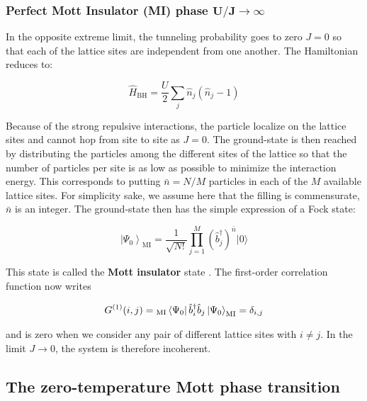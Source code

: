 \subsubsection{Perfect Mott Insulator (MI) phase $\bm{U/J \to \infty}$}

In the opposite extreme limit, the tunneling probability goes to zero $J=0$ so that each of the lattice sites are independent from one another. The Hamiltonian reduces to:

\begin{equation}
    \hat{H}_{\mathrm{BH}} = \frac{U}{2} \sum_j \hat{n}_j (\hat{n}_j -1)
\end{equation}

Because of the strong repulsive interactions, the particle localize on the lattice sites and cannot hop from site to site as $J=0$. The ground-state is then reached by distributing the particles among the different sites of the lattice so that the number of particles per site is as low as possible to minimize the interaction energy. This corresponds to putting $\bar{n}=N/M$ particles in each of the $M$ available lattice sites. For simplicity sake, we assume here that the filling is commensurate, \ie $\bar{n}$ is an integer. The ground-state then has the simple expression of a Fock state:

\begin{equation}
    \left|\Psi_{0}\right\rangle_{\mathrm{MI}}=\frac{1}{\sqrt{N !}} \prod_{j=1}^{M}\left(\hat{b}_{j}^{\dagger}\right)^{\bar{n}}|0\rangle
    \label{eq:ground-state_MI}
\end{equation}

\noindent This state is called the \textbf{Mott insulator} state \cite{fisher1989boson}. The first-order correlation function now writes

\begin{equation}
     G^{(1)}(i,j)= {}_{\mathrm{MI}} \bra{\Psi_0} \hat{b}^{\dagger}_i \hat{b}_j \ket{\Psi_0}_{\mathrm{MI}} = \delta_{i,j}
\end{equation}

\noindent and is zero when we consider any pair of different lattice sites with $i \neq j$. In the limit $J \to 0$, the system is therefore incoherent.



\subsection{The zero-temperature Mott phase transition}

